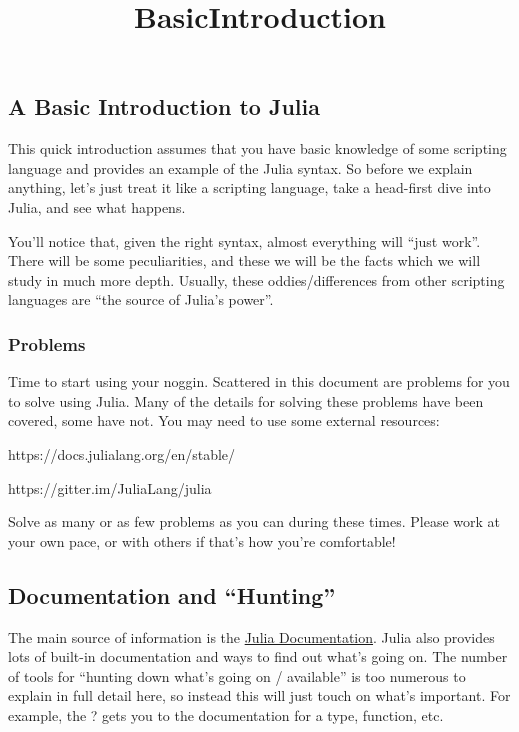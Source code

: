 \documentclass[11pt]{article}
\title{BasicIntroduction}
\begin{document}
    
    
    \maketitle
    
    

    
    \subsection{A Basic Introduction to
Julia}\label{a-basic-introduction-to-julia}

This quick introduction assumes that you have basic knowledge of some
scripting language and provides an example of the Julia syntax. So
before we explain anything, let's just treat it like a scripting
language, take a head-first dive into Julia, and see what happens.

You'll notice that, given the right syntax, almost everything will
``just work''. There will be some peculiarities, and these we will be
the facts which we will study in much more depth. Usually, these
oddies/differences from other scripting languages are ``the source of
Julia's power''.

    \subsubsection{Problems}\label{problems}

Time to start using your noggin. Scattered in this document are problems
for you to solve using Julia. Many of the details for solving these
problems have been covered, some have not. You may need to use some
external resources:

https://docs.julialang.org/en/stable/

https://gitter.im/JuliaLang/julia

Solve as many or as few problems as you can during these times. Please
work at your own pace, or with others if that's how you're comfortable!

    \subsection{Documentation and
``Hunting''}\label{documentation-and-hunting}

The main source of information is the
\href{http://docs.julialang.org/en/latest/manual/}{Julia Documentation}.
Julia also provides lots of built-in documentation and ways to find out
what's going on. The number of tools for ``hunting down what's going on
/ available'' is too numerous to explain in full detail here, so instead
this will just touch on what's important. For example, the ? gets you to
the documentation for a type, function, etc.
\end{document}
